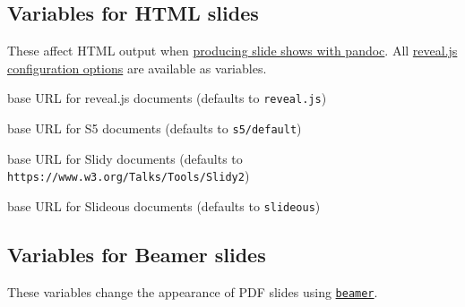 \documentclass[
]{article}
\providecommand{\tightlist}{%
  \setlength{\itemsep}{0pt}\setlength{\parskip}{0pt}}
\begin{document}
\hypertarget{variables-for-html-slides}{%
\subsection{Variables for HTML slides}\label{variables-for-html-slides}}

These affect HTML output when
\protect\hyperlink{producing-slide-shows-with-pandoc}{producing slide
shows with pandoc}. All
\href{https://github.com/hakimel/reveal.js\#configuration}{reveal.js
configuration options} are available as variables.

\begin{description}
\tightlist
\item[\texttt{revealjs-url}]
base URL for reveal.js documents (defaults to \texttt{reveal.js})
\item[\texttt{s5-url}]
base URL for S5 documents (defaults to \texttt{s5/default})
\item[\texttt{slidy-url}]
base URL for Slidy documents (defaults to
\texttt{https://www.w3.org/Talks/Tools/Slidy2})
\item[\texttt{slideous-url}]
base URL for Slideous documents (defaults to \texttt{slideous})
\end{description}

\hypertarget{variables-for-beamer-slides}{%
\subsection{Variables for Beamer
slides}\label{variables-for-beamer-slides}}

These variables change the appearance of PDF slides using
\href{https://ctan.org/pkg/beamer}{\texttt{beamer}}.
\end{document}
